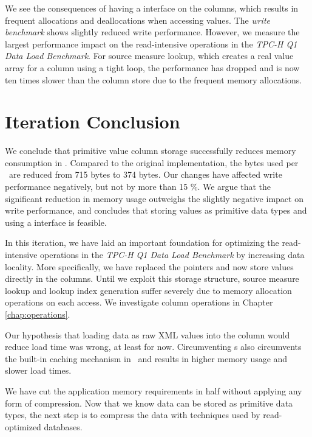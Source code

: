 We see the consequences of having a  interface on the columns, which results in frequent allocations and deallocations when accessing values. The \textit{write benchmark} shows slightly reduced write performance. However, we measure the largest performance impact on the read-intensive operations in the \textit{TPC-H Q1 Data Load Benchmark}. For source measure lookup, which creates a real value array for a column using a tight loop, the performance has dropped and is now ten times slower than the  column store due to the frequent memory allocations.


\section{Iteration Conclusion}
\label{sec:Iteration Conclusion}
We conclude that primitive value column storage successfully reduces memory consumption in \gap. Compared to the original implementation, the bytes used per \lineitem~are reduced from 715 bytes to 374 bytes. Our changes have affected write performance negatively, but not by more than 15 \%. We argue that the significant reduction in memory usage outweighs the slightly negative impact on write performance, and concludes that storing values as primitive data types and using a  interface is feasible. 

In this iteration, we have laid an important foundation for optimizing the read-intensive operations in the \textit{TPC-H Q1 Data Load Benchmark} by increasing data locality. More specifically, we have replaced the  pointers and now store values directly in the columns. Until we exploit this storage structure, source measure lookup and lookup index generation suffer severely due to memory allocation operations on each access. We investigate column operations in Chapter \ref{chap:operations}.

Our hypothesis that loading data as raw XML values into the column would reduce load time was wrong, at least for now. Circumventing s also circumvents the built-in caching mechanism in \gap~and results in higher memory usage and slower load times.  

We have cut the application memory requirements in half without applying any form of compression. Now that we know data can be stored as primitive data types, the next step is to compress the data with techniques used by read-optimized databases.

